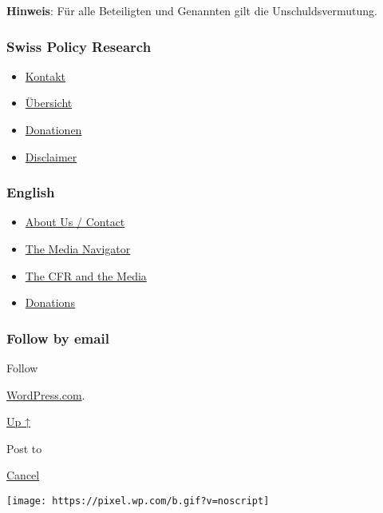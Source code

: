 \textbf{Hinweis}: Für alle Beteiligten und Genannten gilt die
Unschuldsvermutung.

\hypertarget{swiss-policy-research}{%
\subsubsection{Swiss Policy Research}\label{swiss-policy-research}}

\begin{itemize}
\tightlist
\item
  \href{https://swprs.org/kontakt/}{Kontakt}
\item
  \href{https://swprs.org/uebersicht/}{Übersicht}
\item
  \href{https://swprs.org/donationen/}{Donationen}
\item
  \href{https://swprs.org/disclaimer/}{Disclaimer}
\end{itemize}

\hypertarget{english}{%
\subsubsection{English}\label{english}}

\begin{itemize}
\tightlist
\item
  \href{https://swprs.org/contact/}{About Us / Contact}
\item
  \href{https://swprs.org/media-navigator/}{The Media Navigator}
\item
  \href{https://swprs.org/the-american-empire-and-its-media/}{The CFR
  and the Media}
\item
  \href{https://swprs.org/donations/}{Donations}
\end{itemize}

\hypertarget{follow-by-email}{%
\subsubsection{Follow by email}\label{follow-by-email}}

Follow

\href{https://wordpress.com/?ref=footer_custom_com}{WordPress.com}.

\protect\hyperlink{}{Up ↑}

Post to

\protect\hyperlink{}{Cancel}

\texttt{[image: https://pixel.wp.com/b.gif?v=noscript]}
